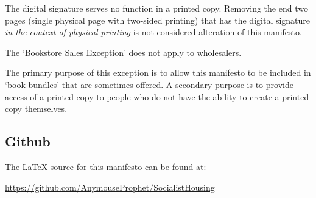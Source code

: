 The digital signature serves no function in a printed copy. Removing the end two pages (single physical page with two-sided printing) that has the digital signature \emph{in the context of physical printing} is not considered alteration of this manifesto.

The `Bookstore Sales Exception' does not apply to wholesalers.

The primary purpose of this exception is to allow this manifesto to be included in `book bundles' that are sometimes offered. A secondary purpose is to provide access of a printed copy to people who do not have the ability to create a printed copy themselves.


\subsection{Github}

The \LaTeX{} source for this manifesto can be found at:

\bigskip

\url{https://github.com/AnymouseProphet/SocialistHousing} 
